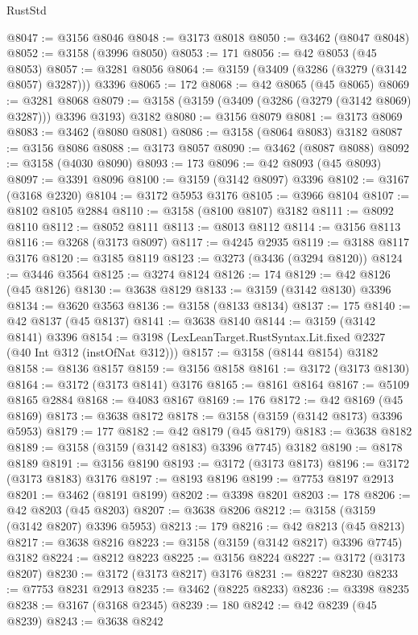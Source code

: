 \begin{lexlean}{RustStd}
\begin{coremodule}
@8047 := @3156 @8046
@8048 := @3173 @8018
@8050 := @3462 (@8047 @8048)
@8052 := @3158 (@3996 @8050)
@8053 := 171
@8056 := @42 @8053 (@45 @8053)
@8057 := @3281 @8056
@8064 := @3159 (@3409 (@3286 (@3279 (@3142 @8057) @3287))) @3396
@8065 := 172
@8068 := @42 @8065 (@45 @8065)
@8069 := @3281 @8068
@8079 := @3158 (@3159 (@3409 (@3286 (@3279 (@3142 @8069) @3287))) @3396 @3193) @3182
@8080 := @3156 @8079
@8081 := @3173 @8069
@8083 := @3462 (@8080 @8081)
@8086 := @3158 (@8064 @8083) @3182
@8087 := @3156 @8086
@8088 := @3173 @8057
@8090 := @3462 (@8087 @8088)
@8092 := @3158 (@4030 @8090)
@8093 := 173
@8096 := @42 @8093 (@45 @8093)
@8097 := @3391 @8096
@8100 := @3159 (@3142 @8097) @3396
@8102 := @3167 (@3168 @2320)
@8104 := @3172 @5953 @3176
@8105 := @3966 @8104
@8107 := @8102 @8105 @2884
@8110 := @3158 (@8100 @8107) @3182
@8111 := @8092 @8110
@8112 := @8052 @8111
@8113 := @8013 @8112
@8114 := @3156 @8113
@8116 := @3268 (@3173 @8097)
@8117 := @4245 @2935
@8119 := @3188 @8117 @3176
@8120 := @3185 @8119
@8123 := @3273 (@3436 (@3294 @8120))
@8124 := @3446 @3564
@8125 := @3274 @8124
@8126 := 174
@8129 := @42 @8126 (@45 @8126)
@8130 := @3638 @8129
@8133 := @3159 (@3142 @8130) @3396
@8134 := @3620 @3563
@8136 := @3158 (@8133 @8134)
@8137 := 175
@8140 := @42 @8137 (@45 @8137)
@8141 := @3638 @8140
@8144 := @3159 (@3142 @8141) @3396
@8154 := @3198 (LexLeanTarget.RustSyntax.Lit.fixed @2327 (@40 Int @312 (instOfNat @312)))
@8157 := @3158 (@8144 @8154) @3182
@8158 := @8136 @8157
@8159 := @3156 @8158
@8161 := @3172 (@3173 @8130)
@8164 := @3172 (@3173 @8141) @3176
@8165 := @8161 @8164
@8167 := @5109 @8165 @2884
@8168 := @4083 @8167
@8169 := 176
@8172 := @42 @8169 (@45 @8169)
@8173 := @3638 @8172
@8178 := @3158 (@3159 (@3142 @8173) @3396 @5953)
@8179 := 177
@8182 := @42 @8179 (@45 @8179)
@8183 := @3638 @8182
@8189 := @3158 (@3159 (@3142 @8183) @3396 @7745) @3182
@8190 := @8178 @8189
@8191 := @3156 @8190
@8193 := @3172 (@3173 @8173)
@8196 := @3172 (@3173 @8183) @3176
@8197 := @8193 @8196
@8199 := @7753 @8197 @2913
@8201 := @3462 (@8191 @8199)
@8202 := @3398 @8201
@8203 := 178
@8206 := @42 @8203 (@45 @8203)
@8207 := @3638 @8206
@8212 := @3158 (@3159 (@3142 @8207) @3396 @5953)
@8213 := 179
@8216 := @42 @8213 (@45 @8213)
@8217 := @3638 @8216
@8223 := @3158 (@3159 (@3142 @8217) @3396 @7745) @3182
@8224 := @8212 @8223
@8225 := @3156 @8224
@8227 := @3172 (@3173 @8207)
@8230 := @3172 (@3173 @8217) @3176
@8231 := @8227 @8230
@8233 := @7753 @8231 @2913
@8235 := @3462 (@8225 @8233)
@8236 := @3398 @8235
@8238 := @3167 (@3168 @2345)
@8239 := 180
@8242 := @42 @8239 (@45 @8239)
@8243 := @3638 @8242

\end{coremodule}
\end{lexlean}
